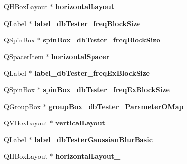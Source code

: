 \begin{DoxyCompactItemize}
\mbox{\label{class_ui___main_window_a394292258659184056304a4954b5042b}} 
Q\+H\+Box\+Layout $\ast$ {\bfseries horizontal\+Layout\+\_}
\item 
\mbox{\label{class_ui___main_window_aa277b0cd538f4305ed133adc35079eee}} 
Q\+Label $\ast$ {\bfseries label\+\_\+db\+Tester\+\_\+freq\+Block\+Size}
\item 
\mbox{\label{class_ui___main_window_a289bd6801991f4d5b6213d54bc0ba8a9}} 
Q\+Spin\+Box $\ast$ {\bfseries spin\+Box\+\_\+db\+Tester\+\_\+freq\+Block\+Size}
\item 
\mbox{\label{class_ui___main_window_a2d014d26e5fcd75f277645be825e5167}} 
Q\+Spacer\+Item $\ast$ {\bfseries horizontal\+Spacer\+\_}
\item 
\mbox{\label{class_ui___main_window_a301b235e514d3c23d3cdd89ce2f679a1}} 
Q\+Label $\ast$ {\bfseries label\+\_\+db\+Tester\+\_\+freq\+Ex\+Block\+Size}
\item 
\mbox{\label{class_ui___main_window_a80e6be3b7e4dd5b36041df64baea6e5a}} 
Q\+Spin\+Box $\ast$ {\bfseries spin\+Box\+\_\+db\+Tester\+\_\+freq\+Ex\+Block\+Size}
\item 
\mbox{\label{class_ui___main_window_aeeffc33bd94d6e7e790daa2e427fe301}} 
Q\+Group\+Box $\ast$ {\bfseries group\+Box\+\_\+db\+Tester\+\_\+\+Parameter\+O\+Map}
\item 
\mbox{\label{class_ui___main_window_aec98c1da19ec397f73ccd25251806b18}} 
Q\+V\+Box\+Layout $\ast$ {\bfseries vertical\+Layout\+\_}
\item 
\mbox{\label{class_ui___main_window_a4f33f5142eac8ff861c2aa201518512f}} 
Q\+Label $\ast$ {\bfseries label\+\_\+db\+Tester\+Gaussian\+Blur\+Basic}
\item 
\mbox{\label{class_ui___main_window_acbfe65f9d2895246b00c82c815b5369e}} 
Q\+H\+Box\+Layout $\ast$ {\bfseries horizontal\+Layout\+\_}
\item 

\end{DoxyCompactItemize}
